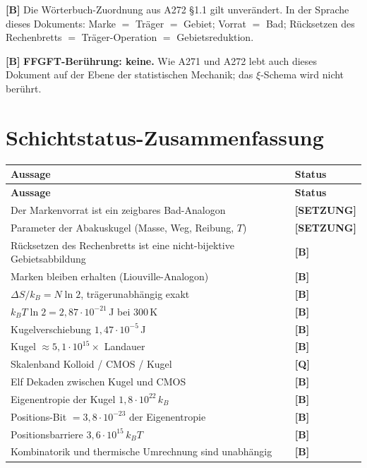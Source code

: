 \textbf{[B]} Die Wörterbuch-Zuordnung aus A272 §1.1 gilt unverändert. In der Sprache dieses
Dokuments: Marke $=$ Träger $=$ Gebiet; Vorrat $=$ Bad; Rücksetzen des
Rechenbretts $=$ Träger-Operation $=$ Gebietsreduktion.

\textbf{[B]} \textbf{FFGFT-Berührung: keine.} Wie A271 und A272 lebt auch dieses Dokument
auf der Ebene der statistischen Mechanik; das $\xi$-Schema wird nicht berührt.

\section{Schichtstatus-Zusammenfassung}

\begin{center}
\small
\begin{longtable}{@{}p{}l@{}}
\toprule
\textbf{Aussage} & \textbf{Status} \\
\midrule
\endfirsthead
\toprule
\textbf{Aussage} & \textbf{Status} \\
\midrule
\endhead
Der Markenvorrat ist ein zeigbares Bad-Analogon & \textbf{[SETZUNG]} \\
Parameter der Abakuskugel (Masse, Weg, Reibung, $T$) & \textbf{[SETZUNG]} \\
Rücksetzen des Rechenbretts ist eine nicht-bijektive Gebietsabbildung & \textbf{[B]} \\
Marken bleiben erhalten (Liouville-Analogon) & \textbf{[B]} \\
$\Delta S/k_B = N\ln 2$, trägerunabhängig exakt & \textbf{[B]} \\
$k_BT\ln 2 = 2{,}87\cdot10^{-21}$\,J bei 300\,K & \textbf{[B]} \\
Kugelverschiebung $1{,}47\cdot10^{-5}$\,J & \textbf{[B]} \\
Kugel $\approx 5{,}1\cdot10^{15}\times$ Landauer & \textbf{[B]} \\
Skalenband Kolloid / CMOS / Kugel & \textbf{[Q]} \\
Elf Dekaden zwischen Kugel und CMOS & \textbf{[B]} \\
Eigenentropie der Kugel $1{,}8\cdot10^{22}\,k_B$ & \textbf{[B]} \\
Positions-Bit $= 3{,}8\cdot10^{-23}$ der Eigenentropie & \textbf{[B]} \\
Positionsbarriere $3{,}6\cdot10^{15}\,k_BT$ & \textbf{[B]} \\
Kombinatorik und thermische Umrechnung sind unabhängig & \textbf{[B]} \\

\end{longtable}
\end{center}

